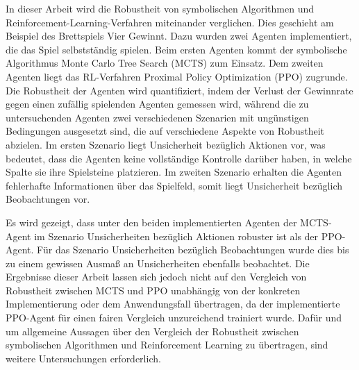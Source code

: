 In dieser Arbeit wird die Robustheit von symbolischen Algorithmen und Reinforcement-Learning-Verfahren miteinander verglichen. Dies geschieht am Beispiel des Brettspiels Vier Gewinnt. Dazu wurden zwei Agenten implementiert, die das Spiel selbstständig spielen. Beim ersten Agenten kommt der symbolische Algorithmus Monte Carlo Tree Search (MCTS) zum Einsatz. Dem zweiten Agenten liegt das RL-Verfahren Proximal Policy Optimization (PPO) zugrunde. Die Robustheit der Agenten wird quantifiziert, indem der Verlust der Gewinnrate gegen einen zufällig spielenden Agenten gemessen wird, während die zu untersuchenden Agenten zwei verschiedenen Szenarien mit ungünstigen Bedingungen ausgesetzt sind, die auf verschiedene Aspekte von Robustheit abzielen. Im ersten Szenario liegt Unsicherheit bezüglich Aktionen vor, was bedeutet, dass die Agenten keine vollständige Kontrolle darüber haben, in welche Spalte sie ihre Spielsteine platzieren. Im zweiten Szenario erhalten die Agenten fehlerhafte Informationen über das Spielfeld, somit liegt Unsicherheit bezüglich Beobachtungen vor.

Es wird gezeigt, dass unter den beiden implementierten Agenten der MCTS-Agent im Szenario Unsicherheiten bezüglich Aktionen robuster ist als der PPO-Agent. Für das Szenario Unsicherheiten bezüglich Beobachtungen wurde dies bis zu einem gewissen Ausmaß an Unsicherheiten ebenfalls beobachtet. Die Ergebnisse dieser Arbeit lassen sich jedoch nicht auf den Vergleich von Robustheit zwischen MCTS und PPO unabhängig von der konkreten Implementierung oder dem Anwendungsfall übertragen, da der implementierte PPO-Agent für einen fairen Vergleich unzureichend trainiert wurde. Dafür und um allgemeine Aussagen über den Vergleich der Robustheit zwischen symbolischen Algorithmen und Reinforcement Learning zu übertragen, sind weitere Untersuchungen erforderlich.

\newpage